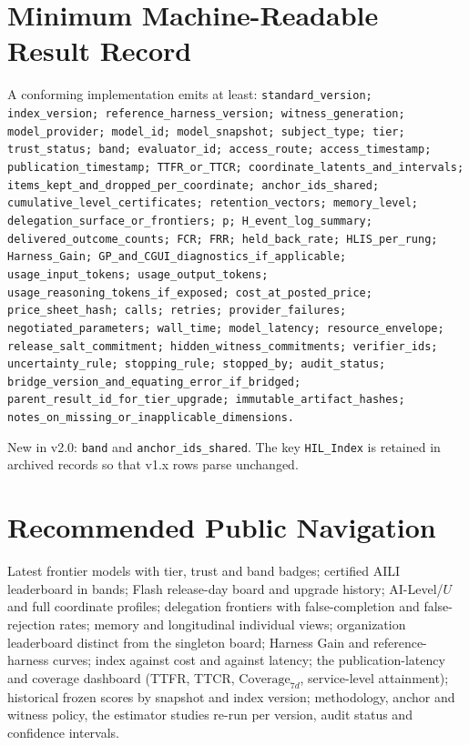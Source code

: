 \documentclass[11pt]{article}
\theoremstyle{definition}
\begin{document}
\section{Minimum Machine-Readable Result Record}\label{app:record}
\begingroup\raggedright\small
A conforming implementation emits at least: \texttt{standard\_version; index\_version; reference\_harness\_version; witness\_generation; model\_provider; model\_id; model\_snapshot; subject\_type; tier; trust\_status; band; evaluator\_id; access\_route; access\_timestamp; publication\_timestamp; TTFR\_or\_TTCR; coordinate\_latents\_and\_intervals; items\_kept\_and\_dropped\_per\_coordinate; anchor\_ids\_shared; cumulative\_level\_certificates; retention\_vectors; memory\_level; delegation\_surface\_or\_frontiers; p; H\_event\_log\_summary; delivered\_outcome\_counts; FCR; FRR; held\_back\_rate; HLIS\_per\_rung; Harness\_Gain; GP\_and\_CGUI\_diagnostics\_if\_applicable; usage\_input\_tokens; usage\_output\_tokens; usage\_reasoning\_tokens\_if\_exposed; cost\_at\_posted\_price; price\_sheet\_hash; calls; retries; provider\_failures; negotiated\_parameters; wall\_time; model\_latency; resource\_envelope; release\_salt\_commitment; hidden\_witness\_commitments; verifier\_ids; uncertainty\_rule; stopping\_rule; stopped\_by; audit\_status; bridge\_version\_and\_equating\_error\_if\_bridged; parent\_result\_id\_for\_tier\_upgrade; immutable\_artifact\_hashes; notes\_on\_missing\_or\_inapplicable\_dimensions.}
\par\endgroup
\noindent New in v2.0: \texttt{band} and \texttt{anchor\_ids\_shared}. The key \texttt{HIL\_Index} is retained in archived records so that v1.x rows parse unchanged.

\section{Recommended Public Navigation}\label{app:navigation}
Latest frontier models with tier, trust and band badges; certified AILI leaderboard in bands; Flash release-day board and upgrade history; AI-Level/$U$ and full coordinate profiles; delegation frontiers with false-completion and false-rejection rates; memory and longitudinal individual views; organization leaderboard distinct from the singleton board; Harness Gain and reference-harness curves; index against cost and against latency; the publication-latency and coverage dashboard (TTFR, TTCR, $\mathrm{Coverage}_{7d}$, service-level attainment); historical frozen scores by snapshot and index version; methodology, anchor and witness policy, the estimator studies re-run per version, audit status and confidence intervals.
\end{document}
